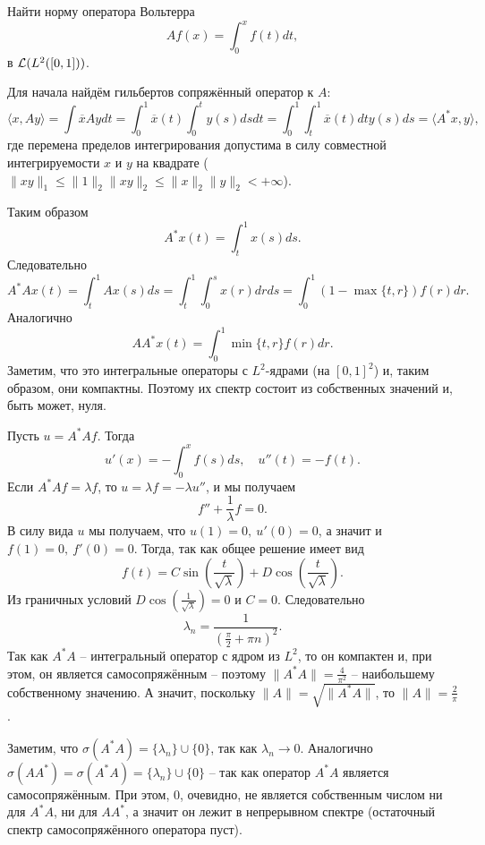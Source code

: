 \begin{task}[12.18]
    Найти норму оператора Вольтерра 
    \[
        Af(x) = \int_0^x f(t)dt,
    \]
    в $\mathcal{L}(L^2([0, 1]))$.
\end{task}
\begin{solution}
    Для начала найдём гильбертов сопряжённый оператор к $A$:
    \[
        \langle x, Ay\rangle = \int \overline{x}Aydt = \int_0^1 \overline{x}(t)\int_0^t y(s)dsdt = \int_0^1 \int_t^1 \overline{x}(t)dt y(s)ds = \langle A^* x, y \rangle,
    \]
    где перемена пределов интегрирования допустима в силу совместной интегрируемости $x$ и $y$ на квадрате ($\|xy\|_1 \leq \|1\|_2\|xy\|_2 \leq \|x\|_2\|y\|_2 < +\infty$).

    Таким образом 
    \[
        A^* x(t) = \int_t^1 x(s)ds.
    \]
    Следовательно
    \[
        A^* A x(t) = \int_t^1 Ax(s)ds = \int_t^1 \int_0^s x(r)drds = \int_0^1 (1 - \max\{t, r\})f(r)dr.
    \]
    Аналогично
    \[
        AA^*x(t) = \int_0^1 \min\{t, r\}f(r)dr.
    \]
    Заметим, что это интегральные операторы с $L^2$-ядрами (на $[0, 1]^2$) и, таким образом, они компактны. Поэтому их спектр состоит из собственных значений и, быть может, нуля.

    Пусть $u = A^* A f$.
    Тогда
    \[
        u'(x) = -\int_0^x f(s)ds, \quad u''(t) = -f(t).
    \]
    Если $A^* A f = \lambda f$, то $u = \lambda f = -\lambda u''$, и мы получаем 
    \[
        f'' + \frac{1}{\lambda} f = 0.
    \]
    В силу вида $u$ мы получаем, что $u(1) = 0, \ u'(0) = 0$, а значит и $f(1) = 0,\ f'(0) = 0$.
    Тогда, так как общее решение имеет вид
    \[
        f(t) = C \sin \left(\frac{t}{\sqrt{\lambda}}\right) + D \cos \left(\frac{t}{\sqrt{\lambda}}\right).
    \]
    Из граничных условий $D \cos \left(\frac{1}{\sqrt{\lambda}}\right) = 0$ и $C = 0$.
    Следовательно
    \[
        \lambda_n = \frac{1}{\left(\frac{\pi}{2} + \pi n\right)^2}.
    \]
    Так как $A^* A$ -- интегральный оператор с ядром из $L^2$, то он компактен и, при этом, он является самосопряжённым -- поэтому $\|A^* A\| = \frac{4}{\pi^2}$ -- наибольшему собственному значению. 
    А значит, поскольку $\|A\| = \sqrt{\|A^*A\|}$, то $\|A\| = \frac{2}{\pi}$.

    Заметим, что $\sigma(A^* A) = \{\lambda_n\} \cup \{0\}$, так как $\lambda_n \rightarrow 0$.
    Аналогично $\sigma(AA^*) = \sigma(A^* A) = \{\lambda_n\} \cup \{0\}$ -- так как оператор $A^* A$ является самосопряжённым.
    При этом, $0$, очевидно, не является собственным числом ни для $A^* A$, ни для $AA^*$, а значит он лежит в непрерывном спектре (остаточный спектр самосопряжённого оператора пуст).
\end{solution}
